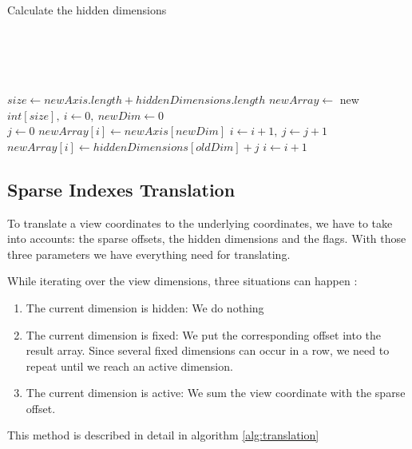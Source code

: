 \begin{algorithm}
	\caption{Calculate the hidden dimensions}
	\label{alg:hiddenDim}
	\begin{algorithmic}
			
		\\
		\\
		
		\EndIf
		\\
		\EndIf
		\\	
		
	
		\State $size\gets newAxis.length + hiddenDimensions.length$ 	
		\State $newArray \gets $ new $int[size],\ i\gets 0,\ newDim\gets 0$
		\\
			\State $j\gets 0$
				\State $newArray[i] \gets newAxis[newDim]$
				\State $i\gets i + 1,\ j\gets j + 1$ 	
			\EndWhile
			\State $newArray[i] \gets hiddenDimensions[oldDim] + j$	
			\State $i\gets i + 1$
		\EndFor
		\EndProcedure
	\end{algorithmic}
\end{algorithm}


\subsection{Sparse Indexes Translation}

To translate a view coordinates to the underlying coordinates, we have to take into accounts: the sparse offsets, the hidden dimensions and the flags. With those three parameters we have everything need for translating.
	
While iterating over the view dimensions, three situations can happen :
\begin{enumerate}
	\item The current dimension is hidden: We do nothing
	\item The current dimension is fixed: We put the corresponding offset into the result array. Since several fixed dimensions can occur in a row, we need to repeat until we reach an active dimension.
	\item The current dimension is active: We sum the view coordinate with the sparse offset.
\end{enumerate}
This method is described in detail in algorithm \ref{alg:translation} 
	
